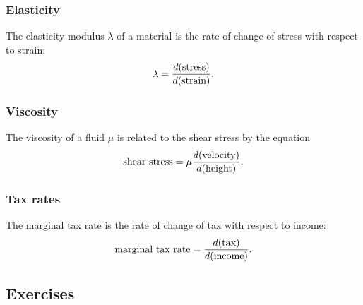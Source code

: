 \documentclass[twoside,openright,titlepage,a4paper]{book}
\begin{document}
\begin{sloppypar}
\subsubsection{Elasticity}

The elasticity modulus $\lambda$ of a material is the rate of change of stress with respect to strain:
\[ \lambda = \frac{d(\hbox{stress})}{d(\hbox{strain})}. \] 

\subsubsection{Viscosity}

The viscosity of a fluid $\mu$ is related to the shear stress by the equation
\[ \hbox{shear stress} = \mu \frac{d(\hbox{velocity})}{d(\hbox{height})}. \] 

\subsubsection{Tax rates}

The marginal tax rate is the rate of change of tax with respect to income:
\[ \hbox{marginal tax rate} = \frac{d(\hbox{tax})}{d(\hbox{income})}. \]

\subsection{Exercises}


\end{sloppypar}
\end{document}
